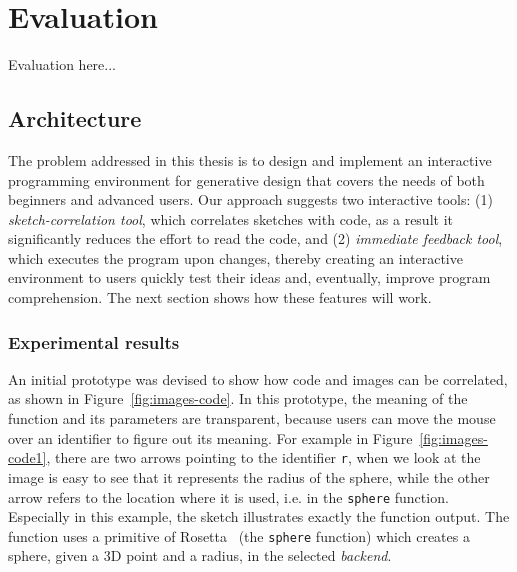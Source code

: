 
\chapter{Evaluation}
\label{chapter:evaluation}
Evaluation here...

\section{Architecture}
\label{sec:arch}

The problem addressed in this thesis is to design and implement an interactive programming environment for generative design that covers the needs of both beginners and advanced users. Our approach suggests two interactive tools: (1) \textit{sketch-correlation tool}, which correlates sketches with code, as a result it significantly reduces the effort to read the code, and (2) \textit{immediate feedback tool}, which executes the program upon changes, thereby creating an interactive environment to users quickly test their ideas and, eventually, improve program comprehension. The next section shows how these features will work.

\subsection{Experimental results}

An initial prototype was devised to show how code and images can be correlated, as shown in Figure~\ref{fig:images-code}. In this prototype, the meaning of the function and its parameters are transparent, because users can move the mouse over an identifier to figure out its meaning. For example in Figure~\ref{fig:images-code1}, there are two arrows pointing to the identifier \texttt{r}, when we look at the image is easy to see that it represents the radius of the sphere, while the other arrow refers to the location where it is used, i.e. in the \texttt{sphere} function. Especially in this example, the sketch illustrates exactly the function output. The function uses a primitive of Rosetta~\citep{lopes2011portable} (the \texttt{sphere} function) which creates a sphere, given a 3D point and a radius, in the selected \textit{backend}.

